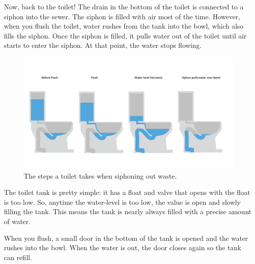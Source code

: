 Now, back to the toilet! The drain in the bottom of the toilet is connected to a siphon into the sewer.   The siphon is filled with air most of the time.  However, when you flush the toilet,  water rushes from the tank into the bowl,  which also fills the siphon.  Once the siphon is filled,  it pulls water out of the toilet until air starts to enter the siphon.  At that point,  the water stops flowing.
\begin{figure}[htbp]
    \centering
    \includegraphics[width=\textwidth]{toilet.png}
    \caption{The steps a toilet takes when siphoning out waste.}
    \label{fig:toiletSteps}
\end{figure}


The toilet tank is pretty simple: it has a float and valve that opens with the float is too low.   So, anytime the water-level is too low,  the value is open and slowly filling the tank.   This means the tank is nearly always filled with a precise amount of water.

When you flush,  a small door in the bottom of the tank is opened and the water rushes into the bowl.  When the water is out,  the door closes again so the tank can refill.
